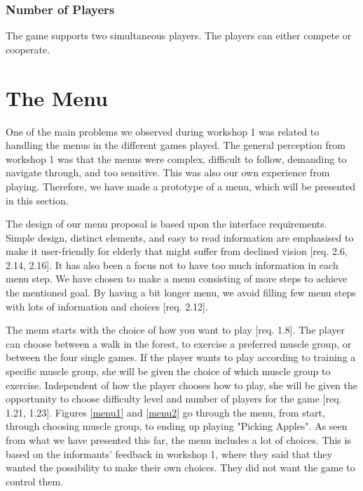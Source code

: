 \subsubsection{Number of Players} 
The game supports two simultaneous players. The players can either compete or cooperate. 


\section{The Menu}
\label{sec:menu}

One of the main problems we observed during workshop 1 was related to handling the menus in the different games played. The general perception from workshop 1 was that the menus were complex, difficult to follow, demanding to navigate through, and too sensitive. This was also our own experience from playing. Therefore, we have made a prototype of a menu, which will be presented in this section.

The design of our menu proposal is based upon the interface requirements. Simple design, distinct elements, and easy to read information are emphasised to make it user-friendly for elderly that might suffer from declined vision [req. 2.6, 2.14, 2.16]. It has also been a focus not to have too much information in each menu step. We have chosen to make a menu consisting of more steps to achieve the mentioned goal. By having a bit longer menu, we avoid filling few menu steps with lots of information and choices [req. 2.12].    

The menu starts with the choice of how you want to play [req. 1.8]. The player can choose between a walk in the forest, to exercise a preferred muscle group, or between the four single games. If the player wants to play according to training a specific muscle group, she will be given the choice of which muscle group to exercise. Independent of how the player chooses how to play, she will be given the opportunity to choose difficulty level and number of players for the game [req. 1.21, 1.23]. Figures \ref{menu1} and \ref{menu2} go through the menu, from start, through choosing muscle group, to ending up playing "Picking Apples". As seen from what we have presented this far, the menu includes a lot of choices. This is based on the informants' feedback in workshop 1, where they said that they wanted the possibility to make their own choices. They did not want the game to control them.   

